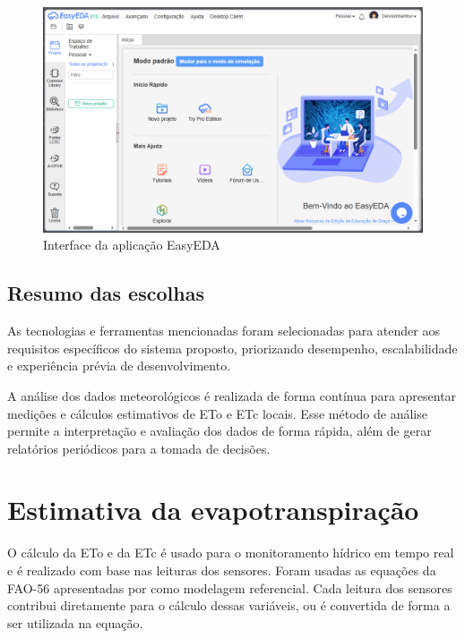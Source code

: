 \begin{figure}[!htb] \centering
  \caption{Interface da aplicação EasyEDA} \label{figura:easyeda}
  \begin{varwidth}{\linewidth}
    \includegraphics[width=16cm]{figuras/easyeda.png}
  \end{varwidth}
\end{figure}

\subsection{Resumo das escolhas}
As tecnologias e ferramentas mencionadas foram selecionadas para atender aos requisitos específicos do sistema proposto, priorizando desempenho, escalabilidade e experiência prévia de desenvolvimento.

A análise dos dados meteorológicos é realizada de forma contínua para apresentar medições e cálculos estimativos de ETo e ETc locais. Esse método de análise permite a interpretação e avaliação dos dados de forma rápida, além de gerar relatórios periódicos para a tomada de decisões.

\section{Estimativa da evapotranspiração}

O cálculo da ETo e da ETc é usado para o monitoramento hídrico em tempo real e é realizado com base nas leituras dos sensores. Foram usadas as equações da FAO-56 apresentadas por \textcite{Allen_evapotranspiration1998} como modelagem referencial. Cada leitura dos sensores contribui diretamente para o cálculo dessas variáveis, ou é convertida de forma a ser utilizada na equação.

